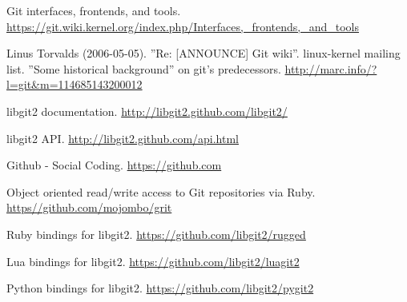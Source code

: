 \begin{thebibliography}{99}
 Git interfaces, frontends, and tools.
  \url{https://git.wiki.kernel.org/index.php/Interfaces,_frontends,_and_tools}

 Linus Torvalds (2006-05-05). ”Re: [ANNOUNCE] Git wiki”.
  linux-kernel mailing list. ”Some historical background” on git’s predecessors.
  \url{http://marc.info/?l=git\&m=114685143200012}

 libgit2 documentation.
  \url{http://libgit2.github.com/libgit2/}

 libgit2 API.
  \url{http://libgit2.github.com/api.html}

 Github - Social Coding.
  \url{https://github.com}

 Object oriented read/write access to Git repositories via Ruby.
  \url{https//github.com/mojombo/grit}

 Ruby bindings for libgit2.
  \url{https://github.com/libgit2/rugged}

 Lua bindings for libgit2.
  \url{https://github.com/libgit2/luagit2}

 Python bindings for libgit2.
  \url{https://github.com/libgit2/pygit2}

\end{thebibliography}
